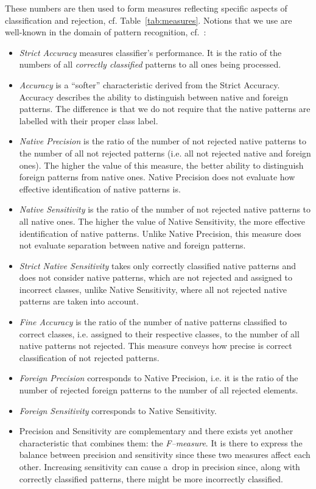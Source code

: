\documentclass{llncs}
\begin{document}
These numbers are then used to form measures reflecting specific aspects of classification and rejection, cf. Table~\ref{tab:measures}. Notions that we use are well-known in the domain of pattern recognition, cf.~\cite{HomendaICAART2015}:
\begin{itemize}
\vspace{-6pt}
  \item \emph{Strict Accuracy} measures classifier's performance. It is the ratio of the numbers of all \emph{correctly classified} patterns to all ones being processed.
  \item \emph{Accuracy} is a ``softer'' characteristic derived from the Strict Accuracy. Accuracy describes the ability to distinguish between native and foreign patterns. The difference is that we do not require that the native patterns are labelled with their proper class label.
  \item \emph{Native Precision} is the ratio of the number of not rejected native patterns to the number of all not rejected patterns (i.e. all not rejected native and foreign ones). The higher the value of this measure, the better ability to distinguish foreign patterns from native ones. Native Precision does not evaluate how effective identification of native patterns is.
  \item \emph{Native Sensitivity} is the ratio of the number of not rejected native patterns to all native ones. The higher the value of Native Sensitivity, the more effective identification of native patterns. Unlike Native Precision, this measure does not evaluate separation between native and foreign patterns.
  \item \emph{Strict Native Sensitivity} takes only correctly classified native patterns and does not consider native patterns, which are not rejected and assigned to incorrect classes, unlike Native Sensitivity, where all not rejected native patterns are taken into account.
  \item \emph{Fine Accuracy} is the ratio of the number of native patterns classified to correct classes, i.e. assigned to their respective classes, to the number of all native patterns not rejected. This measure conveys how precise is correct classification of not rejected patterns.
  \item \emph{Foreign Precision} corresponds to Native Precision, i.e. it is the ratio of the number of rejected foreign patterns  to the number of all rejected elements.
  \item \emph{Foreign Sensitivity} corresponds to Native Sensitivity. %
  \item  Precision and Sensitivity are complementary and there exists yet another characteristic that combines them: the \textit{F--measure}. It is there to express the balance between precision and sensitivity since these two measures affect each other. Increasing sensitivity can cause a~drop in precision since, along with correctly classified patterns, there might be more incorrectly classified.
\vspace{-12pt}
\end{itemize}
\end{document}
